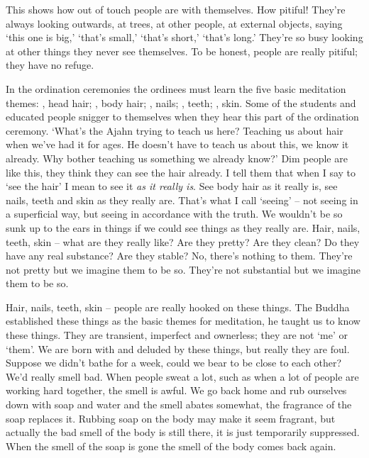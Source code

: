 This shows how out of touch people are with themselves. How pitiful! They're always looking outwards, at trees, at other people, at external objects, saying `this one is big,' `that's small,' `that's short,' `that's long.' They're so busy looking at other things they never see themselves. To be honest, people are really pitiful; they have no refuge. 

In the ordination ceremonies the ordinees must learn the five basic meditation themes: , head hair; , body hair; , nails; , teeth; , skin. Some of the students and educated people snigger to themselves when they hear this part of the ordination ceremony. `What's the Ajahn trying to teach us here? Teaching us about hair when we've had it for ages. He doesn't have to teach us about this, we know it already. Why bother teaching us something we already know?' Dim people are like this, they think they can see the hair already. I tell them that when I say to `see the hair' I mean to see it \textit{as it really is}. See body hair as it really is, see nails, teeth and skin as they really are. That's what I call `seeing' -- not seeing in a superficial way, but seeing in accordance with the truth. We wouldn't be so sunk up to the ears in things if we could see things as they really are. Hair, nails, teeth, skin -- what are they really like? Are they pretty? Are they clean? Do they have any real substance? Are they stable? No, there's nothing to them. They're not pretty but we imagine them to be so. They're not substantial but we imagine them to be so. 

Hair, nails, teeth, skin -- people are really hooked on these things. The Buddha established these things as the basic themes for meditation, he taught us to know these things. They are transient, imperfect and ownerless; they are not `me' or `them'. We are born with and deluded by these things, but really they are foul. Suppose we didn't bathe for a week, could we bear to be close to each other? We'd really smell bad. When people sweat a lot, such as when a lot of people are working hard together, the smell is awful. We go back home and rub ourselves down with soap and water and the smell abates somewhat, the fragrance of the soap replaces it. Rubbing soap on the body may make it seem fragrant, but actually the bad smell of the body is still there, it is just temporarily suppressed. When the smell of the soap is gone the smell of the body comes back again. 

